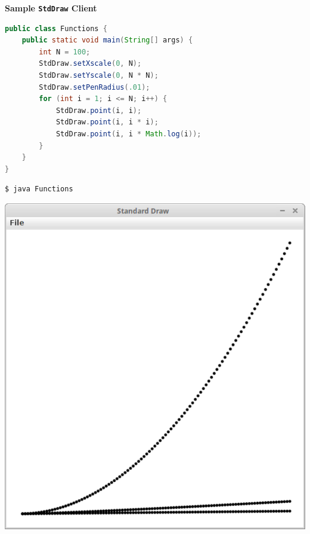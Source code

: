 \documentclass[8pt,a4paper,compress]{beamer}
\begin{document}
\begin{frame}[fragile]
\pause

\textbf{Sample \lstinline$StdDraw$ Client}

\begin{lstlisting}[language=Java]
public class Functions {
    public static void main(String[] args) {
        int N = 100;
        StdDraw.setXscale(0, N);
        StdDraw.setYscale(0, N * N);
        StdDraw.setPenRadius(.01);
        for (int i = 1; i <= N; i++) {
            StdDraw.point(i, i);
            StdDraw.point(i, i * i);
            StdDraw.point(i, i * Math.log(i));
        }
    }	
}
\end{lstlisting}

\pause

\begin{lstlisting}[language=bash]
$ java Functions
\end{lstlisting}

\includegraphics[scale=0.2]{./figures/functions.pdf}

\end{frame}
\end{document}
